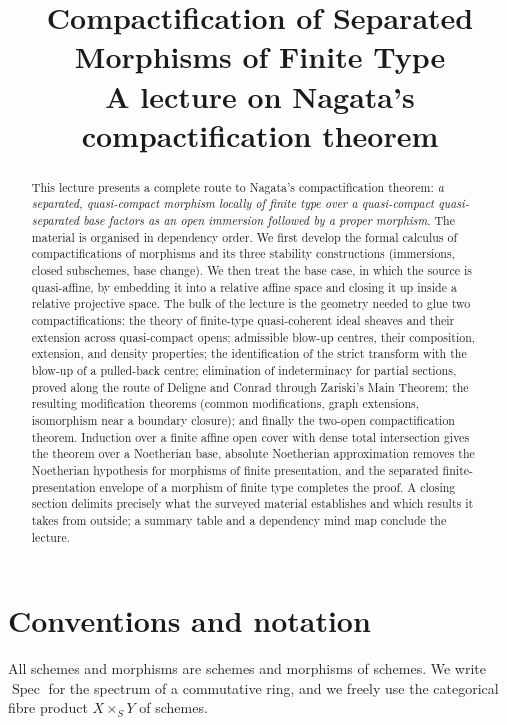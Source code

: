 \documentclass[11pt,a4paper]{article}
\title{\bfseries Compactification of Separated Morphisms of Finite Type\\[2mm]
\large A lecture on Nagata's compactification theorem}
\author{}
\date{}
\theoremstyle{plain}
\theoremstyle{definition}
\theoremstyle{remark}
\newcommand{\Spec}{\operatorname{Spec}}
\newcommand{\qcqs}{quasi-compact quasi-separated}
\begin{document}
\maketitle
\thispagestyle{empty}

\begin{abstract}
\noindent
This lecture presents a complete route to Nagata's compactification theorem:
\emph{a separated, quasi-compact morphism locally of finite type over a
\qcqs{} base factors as an open immersion followed by a proper morphism}.
The material is organised in dependency order. We first develop the formal
calculus of compactifications of morphisms and its three stability
constructions (immersions, closed subschemes, base change). We then treat the
base case, in which the source is quasi-affine, by embedding it into a relative
affine space and closing it up inside a relative projective space. The bulk of
the lecture is the geometry needed to glue two compactifications: the theory of
finite-type quasi-coherent ideal sheaves and their extension across
quasi-compact opens; admissible blow-up centres, their composition, extension,
and density properties; the identification of the strict transform with the
blow-up of a pulled-back centre; elimination of indeterminacy for partial
sections, proved along the route of Deligne and Conrad through Zariski's Main
Theorem; the resulting modification theorems (common modifications, graph
extensions, isomorphism near a boundary closure); and finally the two-open
compactification theorem. Induction over a finite affine open cover with dense
total intersection gives the theorem over a Noetherian base, absolute
Noetherian approximation removes the Noetherian hypothesis for morphisms of
finite presentation, and the separated finite-presentation envelope of a
morphism of finite type completes the proof. A closing section delimits
precisely what the surveyed material establishes and which results it takes
from outside; a summary table and a dependency mind map conclude the lecture.
\end{abstract}

\medskip
{\small\tableofcontents}
\clearpage

\section{Conventions and notation}
\label{sec:conventions}

All schemes and morphisms are schemes and morphisms of schemes. We write
$\Spec$ for the spectrum of a commutative ring, and we freely use the
categorical fibre product $X\times_S Y$ of schemes.
\end{document}
